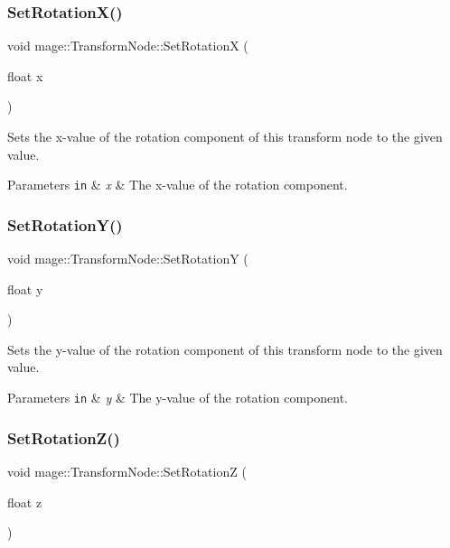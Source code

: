 \subsubsection{\texorpdfstring{Set\+Rotation\+X()}{SetRotationX()}}
{\footnotesize\ttfamily void mage\+::\+Transform\+Node\+::\+Set\+RotationX (\begin{DoxyParamCaption}\item[{float}]{x }\end{DoxyParamCaption})}

Sets the x-\/value of the rotation component of this transform node to the given value.


\begin{DoxyParams}[1]{Parameters}
\mbox{\tt in}  & {\em x} & The x-\/value of the rotation component. \\
\hline
\end{DoxyParams}
\hypertarget{classmage_1_1_transform_node_a60188cf67c3d08f30c9d7c970351b8d3}{}\label{classmage_1_1_transform_node_a60188cf67c3d08f30c9d7c970351b8d3} 
\subsubsection{\texorpdfstring{Set\+Rotation\+Y()}{SetRotationY()}}
{\footnotesize\ttfamily void mage\+::\+Transform\+Node\+::\+Set\+RotationY (\begin{DoxyParamCaption}\item[{float}]{y }\end{DoxyParamCaption})}

Sets the y-\/value of the rotation component of this transform node to the given value.


\begin{DoxyParams}[1]{Parameters}
\mbox{\tt in}  & {\em y} & The y-\/value of the rotation component. \\
\hline
\end{DoxyParams}
\hypertarget{classmage_1_1_transform_node_a8977f1c3b822398e449d9042a5e3cee0}{}\label{classmage_1_1_transform_node_a8977f1c3b822398e449d9042a5e3cee0} 
\subsubsection{\texorpdfstring{Set\+Rotation\+Z()}{SetRotationZ()}}
{\footnotesize\ttfamily void mage\+::\+Transform\+Node\+::\+Set\+RotationZ (\begin{DoxyParamCaption}\item[{float}]{z }\end{DoxyParamCaption})}

